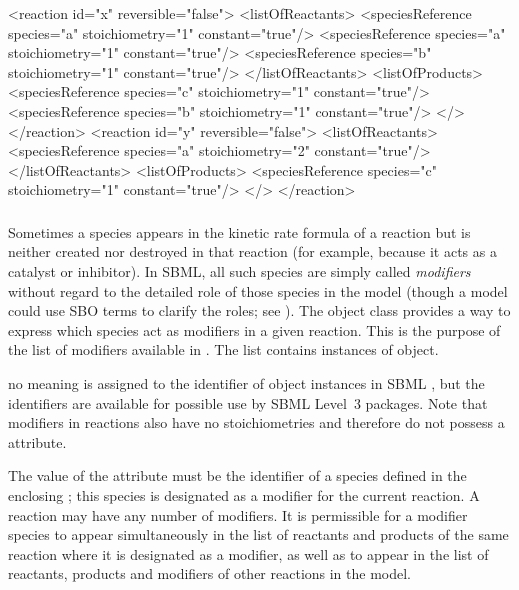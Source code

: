 \begin{example}
<reaction id="x" reversible="false">
    <listOfReactants>
        <speciesReference species="a" stoichiometry="1" constant="true"/>
        <speciesReference species="a" stoichiometry="1" constant="true"/>
        <speciesReference species="b" stoichiometry="1" constant="true"/>
    </listOfReactants>
    <listOfProducts>
        <speciesReference species="c" stoichiometry="1" constant="true"/>
        <speciesReference species="b" stoichiometry="1" constant="true"/>
    </>
</reaction>
<reaction id="y" reversible="false">
    <listOfReactants>
        <speciesReference species="a" stoichiometry="2" constant="true"/>
    </listOfReactants>
    <listOfProducts>
        <speciesReference species="c" stoichiometry="1" constant="true"/>
    </>
</reaction>
\end{example}



\subsubsection{}
\label{subsec:modifierreference}

Sometimes a species appears in the kinetic rate formula of a
reaction but is neither created nor destroyed in that reaction
(for example, because it acts as a catalyst or inhibitor).  In
SBML, all such species are simply called \emph{modifiers} without
regard to the detailed role of those species in the model (though
a model could use SBO terms to clarify the roles; see
).  The \Reaction object class provides a way
to express which species act as modifiers in a given reaction.
This is the purpose of the list of modifiers available in
\Reaction.  The list contains instances of
\ModifierSpeciesReference object.

 no meaning is
assigned to the identifier of \ModifierSpeciesReference object
instances in SBML \thisLV, but the identifiers are available for
possible use by SBML Level~3 packages.  Note that modifiers
in reactions also have no stoichiometries and therefore do not
possess a  attribute.

The value of the  attribute must be the identifier of a
species defined in the enclosing \Model; this species is
designated as a modifier for the current reaction.  A reaction may
have any number of modifiers.  It is permissible for a modifier
species to appear simultaneously in the list of reactants and
products of the same reaction where it is designated as a
modifier, as well as to appear in the list of reactants, products
and modifiers of other reactions in the model.


